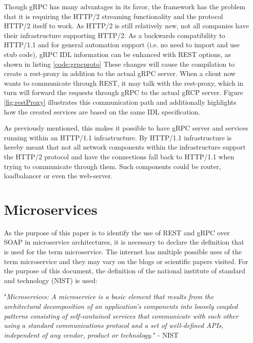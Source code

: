\documentclass[conference]{IEEEtran}
\begin{document}
Though gRPC has many advantages in its favor, the framework has the problem that it is requiring the HTTP/2 streaming functionality and the protocol HTTP/2 itself to work. As HTTP/2 is still relatively new, not all companies have their infrastructure supporting HTTP/2. As a backwards compatibility to HTTP/1.1 and for general automation support (i.e. no need to import and use stub code), gRPC IDL information can be enhanced with REST options, as shown in listing \ref{code:grpcproto} These changes will cause the compilation to create a rest-proxy in addition to the actual gRPC server. When a client now wants to communicate through REST, it may talk with the rest-proxy, which in turn will forward the requests through gRPC to the actual gRCP server. Figure \ref{fig:restProxy} illustrates this communication path and additionally highlights how the created services are based on the same IDL specification.

As previously mentioned, this makes it possible to have gRPC server and services running within an HTTP/1.1 infrastructure. By HTTP/1.1 infrastructure is hereby meant that not all network components within the infrastructure support the HTTP/2 protocol and have the connections fall back to HTTP/1.1 when trying to communicate through them. Such components could be router, loadbalancer or even the web-server.

\section{Microservices}
\label{sec:micros}

As the purpose of this paper is to identify the use of REST and gRPC over SOAP in microservice architectures, it is necessary to declare the definition that is used for the term microservice. The internet has multiple possible uses of the term microservice and they may vary on the blogs or scientific papers visited. For the purpose of this document, the definition of the national institute of standard and technology (NIST) is used:

"\emph{Microservices: A microservice is a basic element that results from the architectural decomposition of an application’s components into loosely coupled patterns consisting of self-contained services that communicate with each other using a standard communications protocol and a set of well-defined APIs, independent of any vendor, product or technology.}" - NIST \cite{karmel2016nist}
\end{document}
